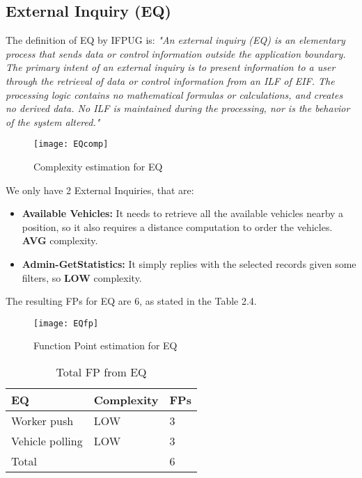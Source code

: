 \subsection{External Inquiry (EQ)}
The definition of EQ by IFPUG is: \bigbreak
\textit{"An external inquiry (EQ) is an elementary process that sends data or control information outside the application boundary. The primary intent of an external inquiry is to present information to a user through the retrieval of data or control information from an ILF of EIF. The processing logic contains no mathematical formulas or calculations, and creates no derived data. No ILF is maintained during the processing, nor is the behavior of the system altered."}
\bigbreak
\begin{figure}
  \centering
  \texttt{[image: EQcomp]}
  \caption{Complexity estimation for EQ}
\end{figure}
We only have 2 External Inquiries, that are:
\begin{itemize}
\item \textbf{Available Vehicles:} It needs to retrieve all the available vehicles nearby a position, so it also requires a distance computation to order the vehicles. \textbf{AVG} complexity.
\item \textbf{Admin-GetStatistics:} It simply replies with the selected records given some filters, so \textbf{LOW} complexity. 
\end{itemize}

The resulting FPs for EQ are 6, as stated in the Table 2.4.

\begin{figure}
  \centering
  \texttt{[image: EQfp]}
  \caption{Function Point estimation for EQ}
\end{figure}

\begin{table}
  \centering
    \begin{tabular}{| l | l | l |}
    \hline
    \textbf{EQ} & \textbf{Complexity} & \textbf{FPs} \\ \hline
    Worker push & LOW & 3 \\ \hline
    Vehicle polling & LOW & 3\\ \hline
    \hline
    \multicolumn{2}{|l|}{Total} & 6 \\ \hline
    \end{tabular}
  \caption{Total FP from EQ}
\end{table}

\clearpage

